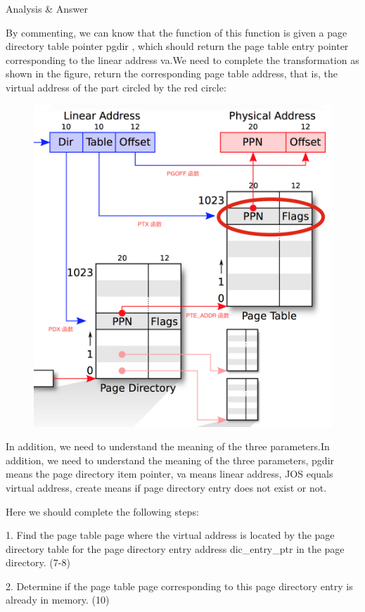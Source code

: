 \begin{flushleft}
{\Large Analysis \& Answer}
\end{flushleft}

By commenting, we can know that the function of this function is given a page directory table pointer pgdir , which should return the page table entry pointer corresponding to the linear address va.We need to complete the transformation as shown in the figure, return the corresponding page table address, that is, the virtual address of the part circled by the red circle:
\begin{figure}[H]
\centering
\includegraphics[width=0.8\linewidth]{figure/pgdir_walk_purpose}
\end{figure}

In addition, we need to understand the meaning of the three parameters.In addition, we need to understand the meaning of the three parameters, pgdir means the page directory item pointer, va means linear address, JOS equals virtual address, create means if page directory entry does not exist or not.

Here we should complete the following steps:

1. Find the page table page where the virtual address is located by the page directory table for the page directory entry address dic\_entry\_ptr in the page directory. (7-8)

2. Determine if the page table page corresponding to this page directory entry is already in memory. (10)

